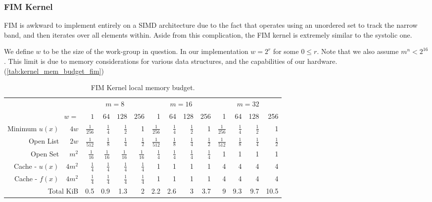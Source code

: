 \documentclass[11pt]{article}       %
\begin{document}
\subsubsection{FIM Kernel}\label{sec:kernel_fim}

FIM is awkward to implement entirely on a SIMD architecture due to the fact that operates using an unordered set to track the narrow band, and then iterates over all elements within. Aside from this complication, the FIM kernel is extremely similar to the systolic one.

We define $w$ to be the size of the work-group in question. In our implementation $w = 2^r$ for some $0 \le r$. Note that we also assume $m^n < 2^16$. This limit is due to memory considerations for various data structures, and the capabilities of our hardware. (\autoref{tab:kernel_mem_budget_fim})

\begin{table}
\centering
\begin{tabular}{|r r|r|r|r|r|r|r|r|r|r|r|r|r|}
\cline{3-14}
\multicolumn{2}{c|}{} & \multicolumn{4}{c|}{$m=8$}                       & \multicolumn{4}{c|}{$m=16$}       & \multicolumn{4}{c|}{$m=32$}     \\ \cline{3-14} 
\multicolumn{2}{r|}{$w=$} 			& $1$       		& $64$   & $128$    & $256$    & 1           & 64    & 128  & 256  & 1           & 64    & 128 & 256 \\ \hline
Minimum $u(x)$       & $4w$	&$\frac{1}{256}$	&$\frac{1}{4}$	&$\frac{1}{2}$	&1	&$\frac{1}{256}$	&$\frac{1}{4}$	&$\frac{1}{2}$	&1	&$\frac{1}{256}$	&$\frac{1}{4}$	&$\frac{1}{2}$	&1\\ \hline
Open List                 & $2w$	&$\frac{1}{512}$	&$\frac{1}{8}$	&$\frac{1}{4}$	&$\frac{1}{2}$	&$\frac{1}{512}$	&$\frac{1}{8}$	&$\frac{1}{4}$	&$\frac{1}{2}$	&$\frac{1}{512}$	&$\frac{1}{8}$	&$\frac{1}{4}$	&$\frac{1}{2}$\\ \hline
Open Set                  & $m^2$	&$\frac{1}{16}$	&$\frac{1}{16}$	&$\frac{1}{16}$	&$\frac{1}{16}$	&$\frac{1}{4}$	&$\frac{1}{4}$	&$\frac{1}{4}$	&$\frac{1}{4}$	&1	&1	&1	&1\\ \hline
Cache - $u(x)$ & $4m^2$	&$\frac{1}{4}$	&$\frac{1}{4}$	&$\frac{1}{4}$	&$\frac{1}{4}$	&1	&1	&1	&1	&4	&4	&4	&4\\ \hline
Cache - $f(x)$ & $4m^2$	&$\frac{1}{4}$	&$\frac{1}{4}$	&$\frac{1}{4}$	&$\frac{1}{4}$	&1	&1	&1	&1	&4	&4	&4	&4\\ \hline
\multicolumn{2}{|r|}{Total KiB}	&0.5	&0.9	&1.3	&2	&2.2	&2.6	&3	&3.7	&9	&9.3	&9.7	&10.5		\\ \hline
\end{tabular}
\caption{FIM Kernel local memory budget.}
\label{tab:kernel_mem_budget_fim}
\end{table}
\end{document}

